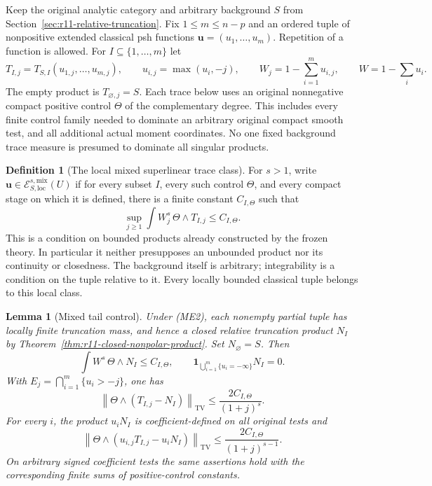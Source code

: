 \documentclass[11pt,a4paper]{article}
\numberwithin{equation}{section}
\newtheorem{lemma}[theorem]{Lemma}
\theoremstyle{definition}
\newtheorem{definition}[theorem]{Definition}
\theoremstyle{remark}
\begin{document}
Keep the original analytic category and arbitrary background $S$ from
Section~\ref{sec:r11-relative-truncation}.  Fix $1\leq m\leq n-p$
and an ordered tuple of nonpositive extended classical psh functions
$\mathbf u=(u_1,\ldots,u_m)$.  Repetition of a function is allowed.
For $I\subseteq\{1,\ldots,m\}$ let
\[
 T_{I,j}=T_{S,I}(u_{1,j},\ldots,u_{m,j}),\qquad
 u_{i,j}=\max(u_i,-j),\qquad
 W_j=1-\sum_{i=1}^m u_{i,j},\qquad W=1-\sum_i u_i.
 \tag{ME1}
\]
The empty product is $T_{\varnothing,j}=S$.  Each trace below uses
an original nonnegative compact positive control $\Theta$ of the
complementary degree.  This includes every finite control family
needed to dominate an arbitrary original compact smooth test, and
all additional actual moment coordinates.  No one fixed background
trace measure is presumed to dominate all singular products.

\begin{definition}[The local mixed superlinear trace class]
\label{def:r11-mixed-superlinear-class}
For $s>1$, write $\mathbf u\in\mathcal E^{s,\mathrm{mix}}_{S,\mathrm{loc}}(U)$
if for every subset $I$, every such control $\Theta$, and every
compact stage on which it is defined, there is a finite constant
$C_{I,\Theta}$ such that
\[
               \sup_{j\geq1}\int W_j^s\,\Theta\wedge T_{I,j}
                                  \leq C_{I,\Theta}.
 \tag{ME2}
\]
This is a condition on bounded products already constructed by the
frozen theory.  In particular it neither presupposes an unbounded
product nor its continuity or closedness.  The background itself is
arbitrary; integrability is a condition on the tuple relative to it.
Every locally bounded classical tuple belongs to this local class.
\end{definition}

\begin{lemma}[Mixed tail control]
\label{lem:r11-mixed-tail-control}
Under (ME2), each nonempty partial tuple has locally finite truncation
mass, and hence a closed relative truncation product $N_I$ by
Theorem~\ref{thm:r11-closed-nonpolar-product}.  Set $N_\varnothing=S$.
Then
\[
 \int W^s\,\Theta\wedge N_I\leq C_{I,\Theta},\qquad
 \mathbf1_{\bigcup_{i=1}^m\{u_i=-\infty\}}N_I=0.
 \tag{ME3}
\]
With $E_j=\bigcap_{i=1}^m\{u_i>-j\}$, one has
\[
 \left\|\Theta\wedge(T_{I,j}-N_I)\right\|_{\mathrm{TV}}
          \leq\frac{2C_{I,\Theta}}{(1+j)^s}.
 \tag{ME4}
\]
For every $i$, the product $u_iN_I$ is coefficient-defined on all
original tests and
\[
 \left\|\Theta\wedge(u_{i,j}T_{I,j}-u_iN_I)\right\|_{\mathrm{TV}}
          \leq\frac{2C_{I,\Theta}}{(1+j)^{s-1}}.
 \tag{ME5}
\]
On arbitrary signed coefficient tests the same assertions hold with
the corresponding finite sums of positive-control constants.
\end{lemma}
\end{document}
